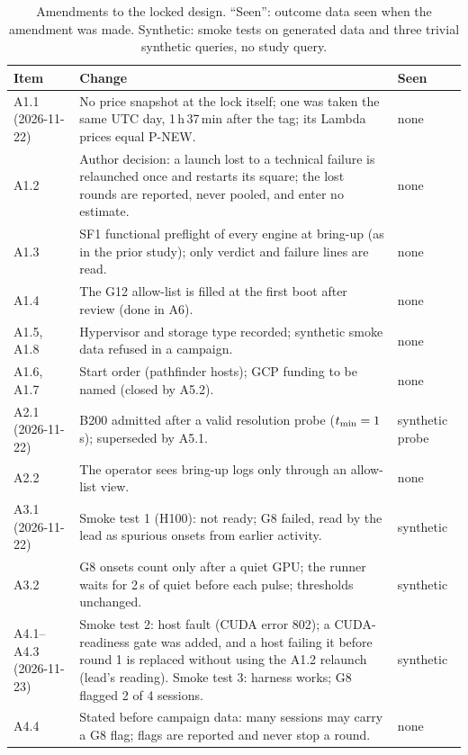 \documentclass[sigconf]{acmart}
\begin{document}
\begin{table}[p]%
\caption{Amendments to the locked design. ``Seen'': outcome data seen when the amendment was made.
Synthetic: smoke tests on generated data and three trivial synthetic queries, no study query.}
\label{tab:deviations}
\footnotesize
\begin{tabular}{@{}lp{}l@{}}
\toprule
Item & Change & Seen \\
\midrule
A1.1 (2026-11-22) & No price snapshot at the lock itself; one was taken the same UTC day, 1\,h\,37\,min after the tag; its Lambda prices equal P-NEW. & none \\
A1.2 & Author decision: a launch lost to a technical failure is relaunched once and restarts its square; the lost rounds are reported, never pooled, and enter no estimate. & none \\
A1.3 & SF1 functional preflight of every engine at bring-up (as in the prior study); only verdict and failure lines are read. & none \\
A1.4 & The \CG{} G12 allow-list is filled at the first \CG{} boot after review (done in A6). & none \\
A1.5, A1.8 & Hypervisor and storage type recorded; synthetic smoke data refused in a campaign. & none \\
A1.6, A1.7 & Start order (pathfinder hosts); GCP funding to be named (closed by A5.2). & none \\
A2.1 (2026-11-22) & B200 admitted after a valid resolution probe ($t_{\min} = 1$\,s); superseded by A5.1. & synthetic probe \\
A2.2 & The operator sees bring-up logs only through an allow-list view. & none \\
A3.1 (2026-11-22) & Smoke test 1 (H100): not ready; G8 failed, read by the lead as spurious onsets from earlier activity. & synthetic \\
A3.2 & G8 onsets count only after a quiet GPU; the runner waits for 2\,s of quiet before each pulse; thresholds unchanged. & synthetic \\
A4.1--A4.3 (2026-11-23) & Smoke test 2: host fault (CUDA error 802); a CUDA-readiness gate was added, and a host failing it before round 1 is replaced without using the A1.2 relaunch (lead's reading). Smoke test 3: harness works; G8 flagged 2 of 4 sessions. & synthetic \\
A4.4 & Stated before campaign data: many sessions may carry a G8 flag; flags are reported and never stop a round. & none \\

\end{tabular}
\end{table}
\end{document}
